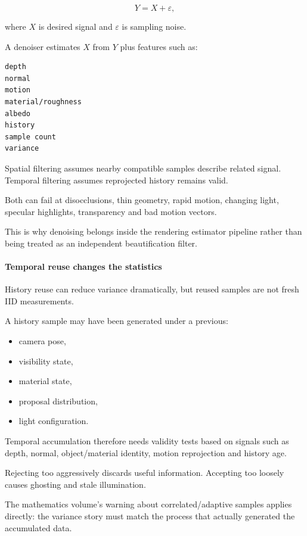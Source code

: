 \[
Y=X+\varepsilon,
\]

where \(X\) is desired signal and \(\varepsilon\) is sampling noise.

A denoiser estimates \(X\) from \(Y\) plus features such as:

\begin{verbatim}
depth
normal
motion
material/roughness
albedo
history
sample count
variance
\end{verbatim}

Spatial filtering assumes nearby compatible samples describe related signal. Temporal filtering assumes reprojected history remains valid.

Both can fail at disocclusions, thin geometry, rapid motion, changing light, specular highlights, transparency and bad motion vectors.

This is why denoising belongs inside the rendering estimator pipeline rather than being treated as an independent beautification filter.

\paragraph{Temporal reuse changes the statistics}\label{03-visual-computing-i-ch001-temporal-reuse-changes-the-statistics}

\hypertarget{03-visual-computing-i-ch001-temporal-reuse-changes-the-statistics}{}

History reuse can reduce variance dramatically, but reused samples are not fresh IID measurements.

A history sample may have been generated under a previous:

\begin{itemize}
\tightlist
\item
  camera pose,
\item
  visibility state,
\item
  material state,
\item
  proposal distribution,
\item
  light configuration.
\end{itemize}

Temporal accumulation therefore needs validity tests based on signals such as depth, normal, object/material identity, motion reprojection and history age.

Rejecting too aggressively discards useful information. Accepting too loosely causes ghosting and stale illumination.

The mathematics volume's warning about correlated/adaptive samples applies directly: the variance story must match the process that actually generated the accumulated data.

